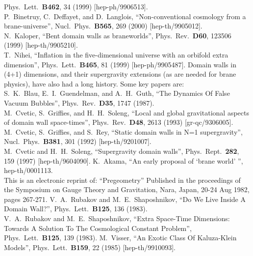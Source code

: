 \documentclass[a4paper,12pt]{article}
\begin{document}
\begin{thebibliography}{99}
Phys.\ Lett.\  {\bf B462}, 34 (1999)
[hep-ph/9906513].
\\
P.~Binetruy, C.~Deffayet, and D.~Langlois,
``Non-conventional cosmology from a brane-universe'',
Nucl.\ Phys.\  {\bf B565}, 269 (2000)
[hep-th/9905012].
\\
N.~Kaloper,
``Bent domain walls as braneworlds'',
Phys.\ Rev.\  {\bf D60}, 123506 (1999)
[hep-th/9905210].
\\
T.~Nihei,
``Inflation in the five-dimensional universe with an orbifold 
extra dimension'',
Phys.\ Lett.\  {\bf B465}, 81 (1999)
[hep-ph/9905487].
Domain walls in (4+1) dimensions, and their supergravity extensions
(as are needed for brane physics), have also had a long history. Some
key papers are:
\\
S.~K.~Blau, E.~I.~Guendelman, and A.~H.~Guth,
``The Dynamics Of False Vacuum Bubbles'',
Phys.\ Rev.\  {\bf D35}, 1747 (1987).
\\
M.~Cvetic, S.~Griffies, and H.~H.~Soleng,
``Local and global gravitational aspects of domain wall space-times'',
Phys.\ Rev.\  {\bf D48}, 2613 (1993)
[gr-qc/9306005].
\\
M.~Cvetic, S.~Griffies, and S.~Rey,
``Static domain walls in N=1 supergravity'',
Nucl.\ Phys.\  {\bf B381}, 301 (1992)
[hep-th/9201007].
\\
M.~Cvetic and H.~H.~Soleng,
``Supergravity domain walls'',
Phys.\ Rept.\  {\bf 282}, 159 (1997)
[hep-th/9604090].
K.~Akama,
``An early proposal of `brane world' '',
hep-th/0001113.\\
This is an electronic reprint of: ``Pregeometry''
Published in the proceedings of the 
Symposium on Gauge Theory and Gravitation, Nara, Japan, 
20-24 Aug 1982, pages 267-271. 
V.~A.~Rubakov and M.~E.~Shaposhnikov,
``Do We Live Inside A Domain Wall?'',
Phys.\ Lett.\  {\bf B125}, 136 (1983).
\\
V.~A.~Rubakov and M.~E.~Shaposhnikov,
``Extra Space-Time Dimensions: Towards A Solution To The 
Cosmological Constant Problem'',
Phys.\ Lett.\  {\bf B125}, 139 (1983).
M.~Visser,
``An Exotic Class Of Kaluza-Klein Models'',
Phys.\ Lett.\  {\bf B159}, 22 (1985)
[hep-th/9910093].

\end{thebibliography}
\end{document}
